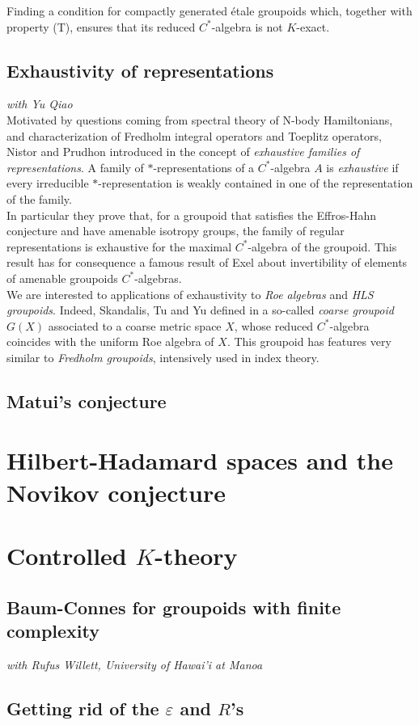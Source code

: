 \begin{project}
Finding a condition for compactly generated \'etale groupoids which, together with property (T), ensures that its reduced $C^*$-algebra is not $K$-exact. 
\end{project}

\subsection*{Exhaustivity of representations}

\textit{with Yu Qiao}\\

Motivated by questions coming from spectral theory of N-body Hamiltonians, and characterization of Fredholm integral operators and Toeplitz operators, Nistor and Prudhon introduced in \cite{NistorPrudhon} the concept of \textit{exhaustive families of representations}. A family of $*$-representations of a $C^*$-algebra $A$ is \textit{exhaustive} if every irreducible $*$-representation is weakly contained in one of the representation of the family.\\

In particular they prove that, for a groupoid that satisfies the Effros-Hahn conjecture and have amenable isotropy groups, the family of regular representations is exhaustive for the maximal $C^*$-algebra of the groupoid. This result has for consequence a famous result of Exel \cite{exel2014invertibility} about invertibility of elements of amenable groupoids $C^*$-algebras.\\

We are interested to applications of exhaustivity to \textit{Roe algebras} and \textit{HLS groupoids}. Indeed, Skandalis, Tu and Yu defined in \cite{SkTuYu} a so-called \textit{coarse groupoid} $G(X)$ associated to a coarse metric space $X$, whose reduced $C^*$-algebra coincides with the uniform Roe algebra of $X$. This groupoid has features very similar to \textit{Fredholm groupoids}, intensively used in index theory.  
 
\subsection*{Matui's conjecture}


\section{Hilbert-Hadamard spaces and the Novikov conjecture}

\section{Controlled $K$-theory}

\subsection*{Baum-Connes for groupoids with finite complexity}

\textit{with Rufus Willett, University of Hawai'i at Manoa}\\

\subsection*{Getting rid of the $\varepsilon$ and $R$'s}

